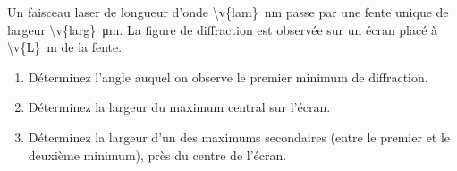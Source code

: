 Un faisceau laser de longueur d'onde \qty{\v{lam}}{nm} passe par une fente unique de largeur \qty{\v{larg}}{\micro\metre}. La figure de diffraction est observée sur un écran placé à \qty{\v{L}}{m} de la fente.

\begin{enumerate}[label=\alph*)]
    \item Déterminez l'angle auquel on observe le premier minimum de diffraction.
    \item Déterminez la largeur du maximum central sur l'écran.
    \item Déterminez la largeur d'un des maximums secondaires (entre le premier et le deuxième minimum), près du centre de l'écran.
\end{enumerate}
